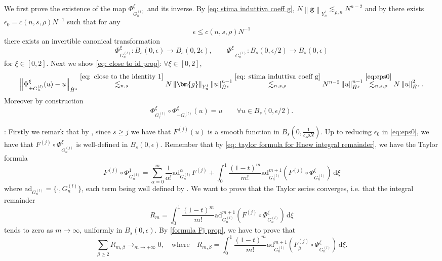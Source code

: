 \documentclass[a4paper,10pt,reqno]{article}
\theoremstyle{definition}
\theoremstyle{plain}
\theoremstyle{plain}
\theoremstyle{definition}
\theoremstyle{plain}
\theoremstyle{plain}
\theoremstyle{plain}
\theoremstyle{definition}
\theoremstyle{definition}
\newcommand{\norm}[1]{\left\lVert #1 \right\rVert}
\begin{document}
We first prove the existence of the map $\Phi_{G_n^{(l)}}^{\xi}$ and its inverse. By \eqref{eq: stima induttiva coeff g}, $N \norm{\bm{g}}_{Y_n^l} \lesssim_{\rho,n} N^{n-2}$ and by  there exists $\epsilon_0= c(n,s,\rho) N^{-1}$ such that for any
\begin{equation}\label{eq:eps0}
\epsilon \leq c(n,s,\rho)  N^{-1}
\end{equation}  
there exists an invertible canonical transformation
\begin{equation}
\Phi_{G_n^{(l)}}^{\xi} : B_s(0,\epsilon) \rightarrow B_s(0,2\epsilon), \qquad \Phi_{-G_n^{(l)}}^{\xi} : B_s(0,\epsilon/2) \rightarrow B_s(0,\epsilon)
\label{eq: dominio e codominio phi e phi_inv}
\end{equation}
for $\xi \in [0,2]$. 
Next we show \eqref{eq: close to id prop}: $\forall \xi \in [0,2]$,
\[
\norm{\Phi_{\pm G_n^{(l)}}^{\xi}(u)-u}_{\dot{H}^s} \stackrel{\eqref{eq: close to the identity 1}}{\lesssim_{n,s}} N \norm{\bm{g}}_{Y_n^l} \norm{u}_{\dot{H}^s}^{n-1} \stackrel{\eqref{eq: stima induttiva coeff g}}{\lesssim_{n,s,\rho}} N^{n-2} \norm{u}_{\dot{H}^s}^{n-1} \stackrel{\eqref{eq:eps0}}{\lesssim_{n,s,\rho}} N \norm{u}_{\dot{H}^s}^2.
\]
Moreover by construction
\[
\Phi_{G_r^{(l)}}^{\xi} \circ \Phi_{-G_r^{(l)}}^{\xi}(u) = u \qquad \forall u \in B_s(0,\epsilon/2).
\]

\medskip

: Firstly we remark that by , since $s \ge j$ we have that $F^{(j)}(u)$ is a smooth function in $B_s(0, \frac{1}{c_s \rho N})$.
Up to reducing $\epsilon_0$ in \eqref{eq:eps0}, we have that $F^{(j)} \circ \Phi_{G_n^{(j)}}^{\xi}$ is well-defined in $B_s(0,\epsilon)$. 
Remember that by \eqref{eq: taylor formula for Hnew integral remainder}, we have the Taylor formula
\begin{equation}\label{eq:Taylor_Fj}
F^{(j)} \circ \Phi_{G_n^{(l)}}^1 = \sum_{\alpha = 0}^m \frac{1}{\alpha !} \mathrm{ad}_{G_n^{(l)}}^{\alpha} F^{(j)} + \int_0^1 \frac{(1-t)^m}{m!} \mathrm{ad}_{G_n^{(l)}}^{m+1}(F^{(j)} \circ \Phi_{G_n^{(l)}}^{\xi}) \, \mathrm{d} \xi
\end{equation}
where $\mathrm{ad}_{G_n^{(l)}} = \{ \cdot, G_n^{(l)} \}$, each term being well defined by .
We want to prove that the Taylor series converges, i.e. that the integral remainder 
\[
R_m = \int_0^1 \frac{(1-t)^m}{m!} \mathrm{ad}_{G_n^{(l)}}^{m+1}(F^{(j)} \circ \Phi_{G_n^{(l)}}^{\xi}) \, \mathrm{d} \xi
\]
tends to zero as $m \to \infty$, uniformly in $B_s(0,\epsilon).$
By \eqref{formula Fj prop}, we have to prove that
\begin{equation}\label{Rmbeta}
\sum_{\beta \ge 2} R_{m,\beta} \longrightarrow_{m \to +\infty} 0, \quad \text{where} \quad R_{m,\beta} = \int_0^1 \frac{(1-t)^m}{m!} \mathrm{ad}_{G_n^{(l)}}^{m+1} (F_{\beta}^{(j)} \circ \Phi_{G_n^{(l)}}^{\xi}) \, \mathrm{d} \xi.
\end{equation}
\end{document}
